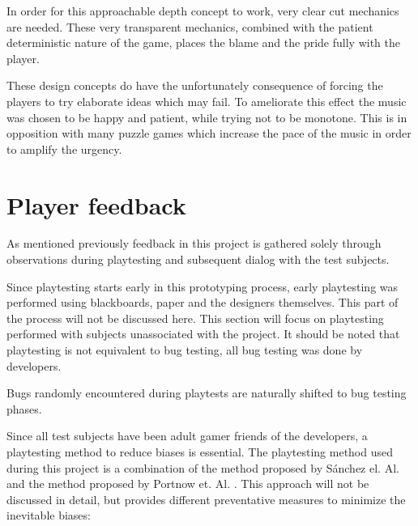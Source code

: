 In order for this approachable depth concept to work, very clear cut
mechanics are needed. These very transparent mechanics, combined with
the patient deterministic nature of the game, places the blame and the
pride fully with the player.

These design concepts do have the unfortunately consequence of forcing
the players to try elaborate ideas which may fail. To ameliorate this
effect the music was chosen to be happy and patient, while trying not
to be monotone. This is in opposition with many puzzle games which
increase the pace of the music in order to amplify the urgency.


\section{Player feedback}
\label{player-feedback}
As mentioned previously feedback in this project is gathered solely
through observations during playtesting and subsequent dialog with the
test subjects.

Since playtesting starts early in this prototyping process, early
playtesting was performed using blackboards, paper and the designers
themselves. This part of the process will not be discussed here.  This
section will focus on playtesting performed with subjects unassociated
with the project.  It should be noted that playtesting is not
equivalent to bug testing, all bug testing was done by developers.

Bugs randomly encountered during playtests are naturally shifted to
bug testing phases.  

Since all test subjects have been adult gamer friends of the
developers, a playtesting method to reduce biases is essential. 
The playtesting method used during this project is a combination of the method 
proposed by Sánchez el. Al. \cite{sanchez09} and the method proposed 
by Portnow et. Al. \cite{portnow}. This approach will not be discussed in detail, 
but provides different preventative measures to minimize the inevitable biases: 

